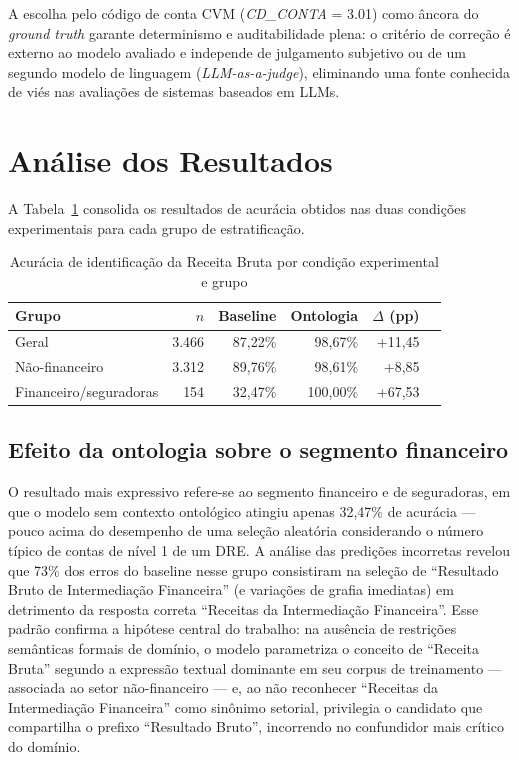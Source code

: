 \documentclass[12pt,a4paper]{article}
\begin{document}
A escolha pelo código de conta CVM (\textit{CD\_CONTA} = 3.01) como âncora do \textit{ground truth} garante determinismo e auditabilidade plena: o critério de correção é externo ao modelo avaliado e independe de julgamento subjetivo ou de um segundo modelo de linguagem (\textit{LLM-as-a-judge}), eliminando uma fonte conhecida de viés nas avaliações de sistemas baseados em LLMs.

\section{Análise dos Resultados}

A Tabela~\ref{tab:resultados} consolida os resultados de acurácia obtidos nas duas condições experimentais para cada grupo de estratificação.

\begin{table}[h]
\centering
\caption{Acurácia de identificação da Receita Bruta por condição experimental e grupo}
\label{tab:resultados}
\begin{tabular}{lrrrrr}
\toprule
\textbf{Grupo} & \textbf{$n$} & \textbf{Baseline} & \textbf{Ontologia} & \textbf{$\Delta$ (pp)} \\
\midrule
Geral                  & 3.466 & 87,22\% & 98,67\% & +11,45 \\
Não-financeiro         & 3.312 & 89,76\% & 98,61\% & +8,85  \\
Financeiro/seguradoras &   154 & 32,47\% & 100,00\% & +67,53 \\
\bottomrule
\end{tabular}
\end{table}

\subsection{Efeito da ontologia sobre o segmento financeiro}

O resultado mais expressivo refere-se ao segmento financeiro e de seguradoras, em que o modelo sem contexto ontológico atingiu apenas 32,47\% de acurácia --- pouco acima do desempenho de uma seleção aleatória considerando o número típico de contas de nível 1 de um DRE. A análise das predições incorretas revelou que 73\% dos erros do baseline nesse grupo consistiram na seleção de ``Resultado Bruto de Intermediação Financeira'' (e variações de grafia imediatas) em detrimento da resposta correta ``Receitas da Intermediação Financeira''. Esse padrão confirma a hipótese central do trabalho: na ausência de restrições semânticas formais de domínio, o modelo parametriza o conceito de ``Receita Bruta'' segundo a expressão textual dominante em seu corpus de treinamento --- associada ao setor não-financeiro --- e, ao não reconhecer ``Receitas da Intermediação Financeira'' como sinônimo setorial, privilegia o candidato que compartilha o prefixo ``Resultado Bruto'', incorrendo no confundidor mais crítico do domínio.
\end{document}
